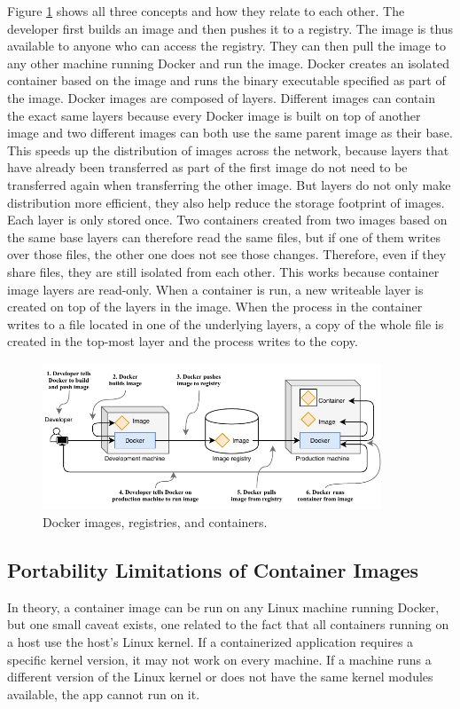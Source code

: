 Figure \ref{fig:dockerflow} shows all three concepts and how they relate to each other. The developer first builds an image and then pushes it to a registry. The image is thus available to anyone who can access the registry. They can then pull the image to any other machine running Docker and run the image. Docker creates an isolated container based on the image and runs the binary executable specified as part of the image.
Docker images are composed of layers. Different images can contain the exact same layers because every Docker image is built on top of another image and two different images can both use the same parent image as their base. This speeds up the distribution of images across the network, because layers that have already been transferred as part of the first image do not need to be transferred again when transferring the other image.
But layers do not only make distribution more efficient, they also help reduce the storage footprint of images. Each layer is only stored once. Two containers created from two images based on the same base layers can therefore read the same files, but if one of them writes over those files, the other one does not see those changes. Therefore, even if they share files, they are still isolated from each other. This works because container image layers are read-only. When a container is run, a new writeable layer is created on top of the layers in the image. When the process in the container writes to a file located in one of the underlying layers, a copy of the whole file is created in the top-most layer and the process writes to the copy.

\begin{figure}[tbp]
	\centering
	\includegraphics[width=0.9\textwidth]{images/dockerflow.pdf}
	\caption{Docker images, registries, and containers.}
	\label{fig:dockerflow}
\end{figure}

\subsection{Portability Limitations of Container Images}
In theory, a container image can be run on any Linux machine running Docker, but one small caveat exists, one related to the fact that all containers running on a host use the host's Linux kernel. If a containerized application requires a specific kernel version, it may not work on every machine. If a machine runs a different version of the Linux kernel or does not have the same kernel modules available, the app cannot run on it.

